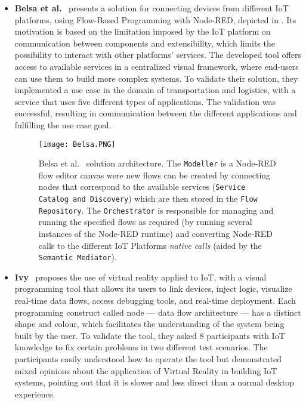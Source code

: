 \begin{itemize}
\item\textbf{Belsa et al.}~\cite{Belsa2018} presents a solution for connecting devices from different IoT platforms, using Flow-Based Programming with Node-RED, depicted in . Its motivation is based on the limitation imposed by the IoT platform on communication between components and extensibility, which limits the possibility to interact with other platforms' services. The developed tool offers access to available services in a centralized visual framework, where end-users can use them to build more complex systems. To validate their solution, they implemented a use case in the domain of transportation and logistics, with a service that uses five different types of applications. The validation was successful, resulting in communication between the different applications and fulfilling the use case goal.

\begin{figure}[h]
\centering
\texttt{[image: Belsa.PNG]}
\caption[Belsa et al. solution architecture.]{Belsa et al.~\cite{Belsa2018} solution architecture. The \texttt{Modeller} is a Node-RED flow editor canvas were new flows can be created by connecting nodes that correspond to the available services (\texttt{Service Catalog and Discovery}) which are then stored in the \texttt{Flow Repository}. The \texttt{Orchestrator} is responsible for managing and running the specified flows as required (by running several instances of the Node-RED runtime) and converting Node-RED calls to the different IoT Platforms \textit{native calls} (aided by the \texttt{Semantic Mediator}).}
\label{fig:belsa}
\end{figure}

\item\textbf{Ivy}~\cite{ivy} proposes the use of virtual reality applied to IoT, with a visual programming tool that allows its users to link devices, inject logic, visualize real-time data flows, access debugging tools, and real-time deployment. Each programming construct called node --- data flow architecture --- has a distinct shape and colour, which facilitates the understanding of the system being built by the user. To validate the tool, they asked 8 participants with IoT knowledge to fix certain problems in two different test scenarios. The participants easily understood how to operate the tool but demonstrated mixed opinions about the application of Virtual Reality in building IoT systems, pointing out that it is slower and less direct than a normal desktop experience.


\end{itemize}
